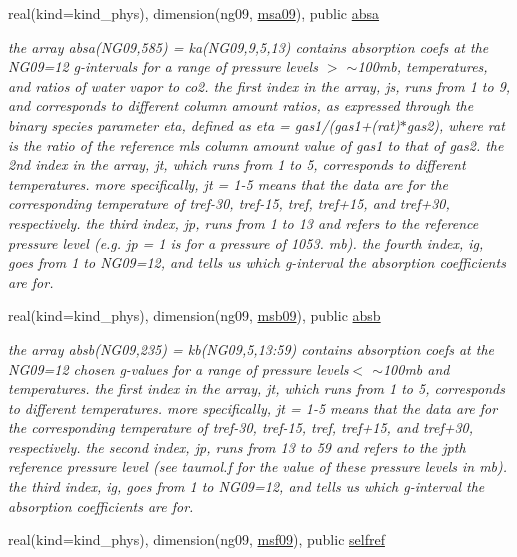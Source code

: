 \begin{Indent}
\begin{DoxyCompactItemize}
real(kind=kind\+\_\+phys), dimension(ng09, \hyperlink{namespacemodule__radlw__kgb09_ab739f0acab23f3140067506b396b3717}{msa09}), public \hyperlink{group__module__radlw__kgbnn_ga7a8726efe46fac4d6cce55ca357199ab}{absa}
\begin{DoxyCompactList}\small\item\em the array absa(\+N\+G09,585) = ka(\+N\+G09,9,5,13) contains absorption coefs at the N\+G09=12 g-\/intervals for a range of pressure levels $>$ $\sim$100mb, temperatures, and ratios of water vapor to co2. the first index in the array, js, runs from 1 to 9, and corresponds to different column amount ratios, as expressed through the binary species parameter eta, defined as eta = gas1/(gas1+(rat)$\ast$gas2), where rat is the ratio of the reference mls column amount value of gas1 to that of gas2. the 2nd index in the array, jt, which runs from 1 to 5, corresponds to different temperatures. more specifically, jt = 1-\/5 means that the data are for the corresponding temperature of tref-\/30, tref-\/15, tref, tref+15, and tref+30, respectively. the third index, jp, runs from 1 to 13 and refers to the reference pressure level (e.\+g. jp = 1 is for a pressure of 1053. mb). the fourth index, ig, goes from 1 to N\+G09=12, and tells us which g-\/interval the absorption coefficients are for. \end{DoxyCompactList}\item 
real(kind=kind\+\_\+phys), dimension(ng09, \hyperlink{group__module__radlw__kgbnn_ga7e6bb7acb0df29586d0bd52f3fc41d90}{msb09}), public \hyperlink{group__module__radlw__kgbnn_gadb2110a245d9f01b3fd1ab058c883003}{absb}
\begin{DoxyCompactList}\small\item\em the array absb(\+N\+G09,235) = kb(\+N\+G09,5,13\+:59) contains absorption coefs at the N\+G09=12 chosen g-\/values for a range of pressure levels$<$ $\sim$100mb and temperatures. the first index in the array, jt, which runs from 1 to 5, corresponds to different temperatures. more specifically, jt = 1-\/5 means that the data are for the corresponding temperature of tref-\/30, tref-\/15, tref, tref+15, and tref+30, respectively. the second index, jp, runs from 13 to 59 and refers to the jpth reference pressure level (see taumol.\+f for the value of these pressure levels in mb). the third index, ig, goes from 1 to N\+G09=12, and tells us which g-\/interval the absorption coefficients are for. \end{DoxyCompactList}\item 
real(kind=kind\+\_\+phys), dimension(ng09, \hyperlink{group__module__radlw__kgbnn_ga7d728ef04b3f26c6b20149084334be5a}{msf09}), public \hyperlink{group__module__radlw__kgbnn_ga1c65e91a215060738292d0ca5a8f38a2}{selfref}

\end{DoxyCompactItemize}
\end{Indent}
